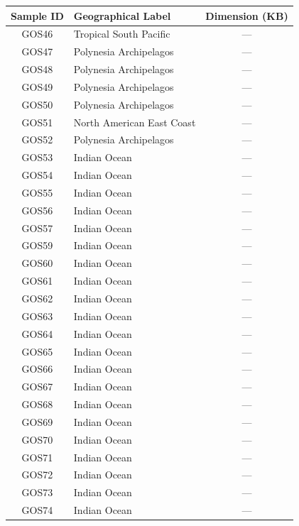 \begin{table}[ht]
\centering
\begin{tabular}{|c|l|c|}
\hline
\textbf{Sample ID} & \textbf{Geographical Label} & \textbf{Dimension (KB)} \\
\hline
GOS46 & Tropical South Pacific      & --- \\
GOS47 & Polynesia Archipelagos     & --- \\
GOS48 & Polynesia Archipelagos     & --- \\
GOS49 & Polynesia Archipelagos     & --- \\
GOS50 & Polynesia Archipelagos     & --- \\
GOS51 & North American East Coast  & --- \\
GOS52 & Polynesia Archipelagos     & --- \\
GOS53 & Indian Ocean               & --- \\
GOS54 & Indian Ocean               & --- \\
GOS55 & Indian Ocean               & --- \\
GOS56 & Indian Ocean               & --- \\
GOS57 & Indian Ocean               & --- \\
GOS59 & Indian Ocean               & --- \\
GOS60 & Indian Ocean               & --- \\
GOS61 & Indian Ocean               & --- \\
GOS62 & Indian Ocean               & --- \\
GOS63 & Indian Ocean               & --- \\
GOS64 & Indian Ocean               & --- \\
GOS65 & Indian Ocean               & --- \\
GOS66 & Indian Ocean               & --- \\
GOS67 & Indian Ocean               & --- \\
GOS68 & Indian Ocean               & --- \\
GOS69 & Indian Ocean               & --- \\
GOS70 & Indian Ocean               & --- \\
GOS71 & Indian Ocean               & --- \\
GOS72 & Indian Ocean               & --- \\
GOS73 & Indian Ocean               & --- \\
GOS74 & Indian Ocean               & --- \\

\end{tabular}
\end{table}
